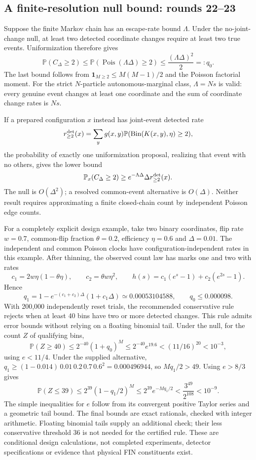 \documentclass[11pt,a4paper]{article}
\newcommand{\Prob}{\mathbb P}
\begin{document}
\subsection{A finite-resolution null bound: rounds 22--23}

Suppose the finite Markov chain has an escape-rate bound $\Lambda$. Under
the no-joint-change null, at least two detected coordinate changes require
at least two true events. Uniformization therefore gives
\begin{equation}\label{eq:null}
 \Prob(C_\Delta\ge2)\le\Prob(\operatorname{Pois}(\Lambda\Delta)\ge2)
 \le\frac{(\Lambda\Delta)^2}{2}=:q_0.
\end{equation}
The last bound follows from
$\mathbf1_{M\ge2}\le M(M-1)/2$ and the Poisson factorial moment.
For the strict $N$-particle autonomous-marginal class, $\Lambda=Ns$ is
valid: every genuine event changes at least one coordinate and the sum of
coordinate change rates is $Ns$.

If a prepared configuration $x$ instead has joint-event detected rate
\[
 r_{\ge2}^{\rm det}(x)=\sum_y g(x,y)
     \Prob(\operatorname{Bin}(K(x,y),\eta)\ge2),
\]
the probability of exactly one uniformization proposal, realizing that
event with no others, gives the lower bound
\[
 \Prob_x(C_\Delta\ge2)\ge
 e^{-\Lambda\Delta}\Delta r_{\ge2}^{\rm det}(x).
\]
The null is $O(\Delta^2)$; a resolved common-event alternative is
$O(\Delta)$. Neither result requires approximating a finite closed-chain
count by independent Poisson edge counts.

For a completely explicit design example, take two binary coordinates,
flip rate $w=0.7$, common-flip fraction $\theta=0.2$, efficiency $\eta=0.6$
and $\Delta=0.01$. The independent and common Poisson clocks have
configuration-independent rates in this example. After thinning, the
observed count law has marks one and two with rates
\[
 c_1=2w\eta(1-\theta\eta),\qquad c_2=\theta w\eta^2,
 \qquad h(s)=c_1(e^s-1)+c_2(e^{2s}-1).
\]
Hence
\[
 q_1=1-e^{-(c_1+c_2)\Delta}(1+c_1\Delta)
 \simeq0.00053104588,
 \qquad q_0\le0.000098.
\]
With 200,000 independently reset trials, the recommended conservative rule
rejects when at least 40 bins have two or more detected changes. This rule
admits error bounds without relying on a floating binomial tail.
Under the null, for the count $Z$ of qualifying bins,
\[
 \Prob(Z\ge40)\le 2^{-40}(1+q_0)^M
 \le 2^{-40}e^{19.6}
 < (11/16)^{20}<10^{-3},
\]
using $e<11/4$. Under the supplied alternative,
$q_1\ge(1-0.014)\,0.01\,0.2\,0.7\,0.6^2=0.000496944$,
so $Mq_1/2>49$. Using $e>8/3$ gives
\[
 \Prob(Z\le39)\le2^{39}(1-q_1/2)^M
 \le2^{39}e^{-Mq_1/2}<\frac{3^{49}}{2^{108}}<10^{-9}.
\]
The simple inequalities for $e$ follow from its convergent positive Taylor
series and a geometric tail bound. The final bounds are exact rationals,
checked with integer arithmetic. Floating binomial tails supply an additional
check; their less conservative threshold 36 is not needed for the certified
rule. These are conditional design calculations, not completed experiments,
detector specifications or evidence that physical FIN constituents exist.
\end{document}
